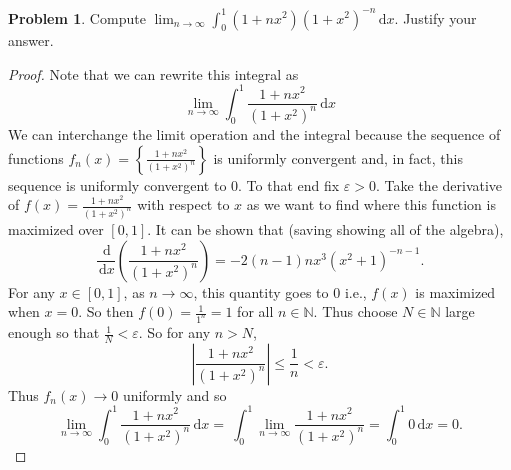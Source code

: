 \documentclass[12pt]{article}
\newcommand{\N}{\mathbb{N}}
\renewcommand{\epsilon}{\varepsilon}
\newcommand{\dif}{\, \mathrm{d}}
\theoremstyle{definition}
\newtheorem{problem}{Problem}
\begin{document}
\begin{problem}

    Compute \( \displaystyle \lim_{n \to \infty} \int_{0}^{1} (1 + nx^{2})(1 + x^{2})^{-n} \dif x \). Justify your answer.

    \begin{proof}
        Note that we can rewrite this integral as 
            \[
                \lim_{n \to \infty} \int_{0}^{1} \frac{1 + nx^{2}}{(1 + x^{2})^{n}}  \dif x 
            \]
         We can interchange the limit operation and the integral because the sequence of functions \( \displaystyle f_n(x) = \left\{ \frac{1+nx^2}{(1 + x^2)^{n}} \right\} \) is uniformly convergent and, in fact, this sequence is uniformly convergent to \( 0 \). To that end fix \( \epsilon > 0 \). Take the derivative of \( \displaystyle f(x) = \frac{1+nx^2}{(1 + x^2)^{n}}  \) with respect to \( x \) as we want to find where this function is maximized over \( [0, 1] \). It can be shown that (saving showing all of the algebra),
            \[
                \frac{\dif}{\dif x} \left( \frac{1+nx^2}{(1 + x^2)^{n}} \right)  = -2(n-1) nx^3 (x^2 + 1)^{-n-1}.
            \]
        For any \( x \in [0, 1] \), as \( n \to \infty \), this quantity goes to \( 0 \) i.e., \( f(x) \) is maximized when \( x = 0 \). So then \( \displaystyle f(0) = \frac{1}{1^n} = 1 \) for all \( n \in \N \). Thus choose \( N \in \N \) large enough so that \( \displaystyle \frac{1}{N} < \epsilon \). So for any \( n > N \),
            \[
                \left|\frac{1+nx^2}{(1 + x^2)^{n}}\right| \leq \frac{1}{n} < \epsilon.
            \]
        Thus \( f_n(x) \to  0 \) uniformly and so 
            \[
                \lim_{n \to \infty} \int_{0}^{1} \frac{1 + nx^{2}}{(1 + x^{2})^{n}}  \dif x =  \ \int_{0}^{1} \lim_{n \to \infty} \frac{1 + nx^{2}}{(1 + x^{2})^{n}} = \int_{0}^{1} 0 \dif x = 0.
            \]
    \end{proof}
    
\end{problem}
\end{document}
